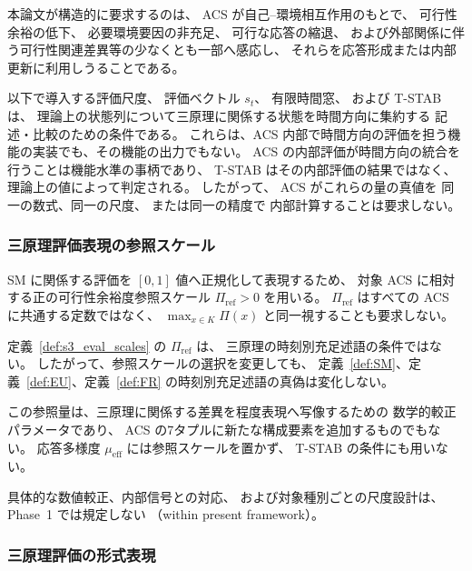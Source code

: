 本論文が構造的に要求するのは、
ACS が自己--環境相互作用のもとで、
可行性余裕の低下、
必要環境要因の非充足、
可行な応答の縮退、
および外部関係に伴う可行性関連差異等の少なくとも一部へ感応し、
それらを応答形成または内部更新に利用しうることである。

以下で導入する評価尺度、
評価ベクトル $s_t$、
有限時間窓、
および T-STAB は、
理論上の状態列について三原理に関係する状態を時間方向に集約する
記述・比較のための条件である。
これらは、ACS 内部で時間方向の評価を担う機能の実装でも、その機能の出力でもない。
ACS の内部評価が時間方向の統合を行うことは機能水準の事柄であり、
T-STAB はその内部評価の結果ではなく、理論上の値によって判定される。
したがって、
ACS がこれらの量の真値を
同一の数式、同一の尺度、
または同一の精度で
内部計算することは要求しない。

\subsubsection{三原理評価表現の参照スケール}

\begin{definition}[三原理評価表現の参照スケール]
\label{def:s3_eval_scales}
SM に関係する評価を $[0,1]$ 値へ正規化して表現するため、
対象 ACS に相対する正の可行性余裕度参照スケール $\Pi_{\mathrm{ref}}>0$ を用いる。
$\Pi_{\mathrm{ref}}$ はすべての ACS に共通する定数ではなく、
$\max_{x\in K}\Pi(x)$ と同一視することも要求しない。
\end{definition}

\begin{remark}[参照スケールの理論上の地位]
\label{rem:s3_scale_status}
定義~\ref{def:s3_eval_scales} の $\Pi_{\mathrm{ref}}$ は、
三原理の時刻別充足述語の条件ではない。
したがって、参照スケールの選択を変更しても、
定義~\ref{def:SM}、定義~\ref{def:EU}、定義~\ref{def:FR}
の時刻別充足述語の真偽は変化しない。

この参照量は、三原理に関係する差異を程度表現へ写像するための
数学的較正パラメータであり、
ACS の7タプルに新たな構成要素を追加するものでもない。
応答多様度 $\mu_{\mathrm{eff}}$ には参照スケールを置かず、
T-STAB の条件にも用いない。

具体的な数値較正、内部信号との対応、
および対象種別ごとの尺度設計は、
Phase~1 では規定しない
（within present framework）。
\end{remark}

\subsubsection{三原理評価の形式表現}

